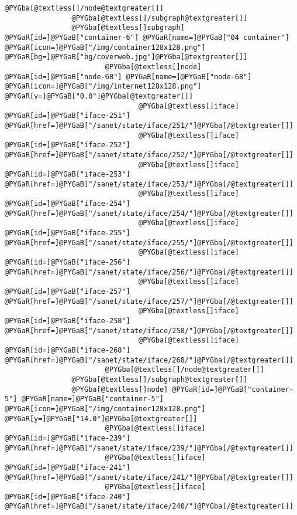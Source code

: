 \documentclass[a4wide,10pt,italian]{manual}
\begin{document}
\begin{Verbatim}[commandchars=@\[\]]
                        @PYGba[@textless[]/node@textgreater[]]
                @PYGba[@textless[]/subgraph@textgreater[]]
                @PYGba[@textless[]subgraph] @PYGaR[id=]@PYGaB["container-6"] @PYGaR[name=]@PYGaB["04 container"] @PYGaR[icon=]@PYGaB["/img/container128x128.png"] @PYGaR[bg=]@PYGaB["bg/coverweb.jpg"]@PYGba[@textgreater[]]
                        @PYGba[@textless[]node] @PYGaR[id=]@PYGaB["node-68"] @PYGaR[name=]@PYGaB["node-68"] @PYGaR[icon=]@PYGaB["/img/internet128x128.png"] @PYGaR[y=]@PYGaB["0.0"]@PYGba[@textgreater[]]
                                @PYGba[@textless[]iface] @PYGaR[id=]@PYGaB["iface-251"] @PYGaR[href=]@PYGaB["/sanet/state/iface/251/"]@PYGba[/@textgreater[]]
                                @PYGba[@textless[]iface] @PYGaR[id=]@PYGaB["iface-252"] @PYGaR[href=]@PYGaB["/sanet/state/iface/252/"]@PYGba[/@textgreater[]]
                                @PYGba[@textless[]iface] @PYGaR[id=]@PYGaB["iface-253"] @PYGaR[href=]@PYGaB["/sanet/state/iface/253/"]@PYGba[/@textgreater[]]
                                @PYGba[@textless[]iface] @PYGaR[id=]@PYGaB["iface-254"] @PYGaR[href=]@PYGaB["/sanet/state/iface/254/"]@PYGba[/@textgreater[]]
                                @PYGba[@textless[]iface] @PYGaR[id=]@PYGaB["iface-255"] @PYGaR[href=]@PYGaB["/sanet/state/iface/255/"]@PYGba[/@textgreater[]]
                                @PYGba[@textless[]iface] @PYGaR[id=]@PYGaB["iface-256"] @PYGaR[href=]@PYGaB["/sanet/state/iface/256/"]@PYGba[/@textgreater[]]
                                @PYGba[@textless[]iface] @PYGaR[id=]@PYGaB["iface-257"] @PYGaR[href=]@PYGaB["/sanet/state/iface/257/"]@PYGba[/@textgreater[]]
                                @PYGba[@textless[]iface] @PYGaR[id=]@PYGaB["iface-258"] @PYGaR[href=]@PYGaB["/sanet/state/iface/258/"]@PYGba[/@textgreater[]]
                                @PYGba[@textless[]iface] @PYGaR[id=]@PYGaB["iface-268"] @PYGaR[href=]@PYGaB["/sanet/state/iface/268/"]@PYGba[/@textgreater[]]
                        @PYGba[@textless[]/node@textgreater[]]
                @PYGba[@textless[]/subgraph@textgreater[]]
                @PYGba[@textless[]node] @PYGaR[id=]@PYGaB["container-5"] @PYGaR[name=]@PYGaB["container-5"] @PYGaR[icon=]@PYGaB["/img/container128x128.png"] @PYGaR[y=]@PYGaB["14.0"]@PYGba[@textgreater[]]
                        @PYGba[@textless[]iface] @PYGaR[id=]@PYGaB["iface-239"] @PYGaR[href=]@PYGaB["/sanet/state/iface/239/"]@PYGba[/@textgreater[]]
                        @PYGba[@textless[]iface] @PYGaR[id=]@PYGaB["iface-241"] @PYGaR[href=]@PYGaB["/sanet/state/iface/241/"]@PYGba[/@textgreater[]]
                        @PYGba[@textless[]iface] @PYGaR[id=]@PYGaB["iface-240"] @PYGaR[href=]@PYGaB["/sanet/state/iface/240/"]@PYGba[/@textgreater[]]

\end{Verbatim}
\end{document}
